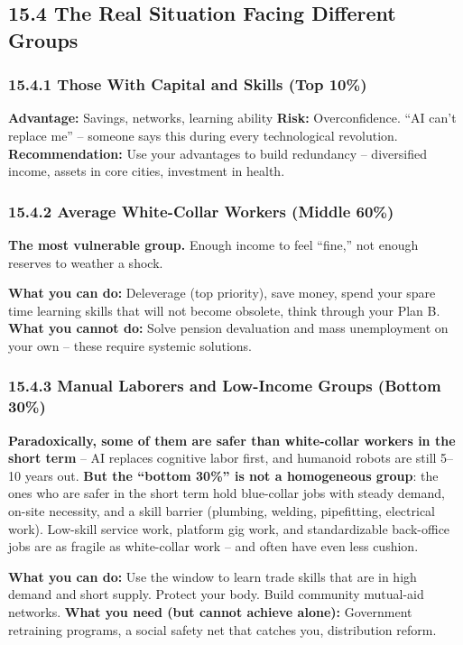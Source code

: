 \documentclass[11pt,a4paper]{article}
\begin{document}
\subsection{15.4 The Real Situation Facing Different Groups}

\subsubsection{15.4.1 Those With Capital and Skills (Top 10\%)}

\textbf{Advantage:} Savings, networks, learning ability \textbf{Risk:} Overconfidence. ``AI can't replace me'' -- someone says this during every technological revolution. \textbf{Recommendation:} Use your advantages to build redundancy -- diversified income, assets in core cities, investment in health.

\subsubsection{15.4.2 Average White-Collar Workers (Middle 60\%)}

\textbf{The most vulnerable group.} Enough income to feel ``fine,'' not enough reserves to weather a shock.

\textbf{What you can do:} Deleverage (top priority), save money, spend your spare time learning skills that will not become obsolete, think through your Plan B. \textbf{What you cannot do:} Solve pension devaluation and mass unemployment on your own -- these require systemic solutions.

\subsubsection{15.4.3 Manual Laborers and Low-Income Groups (Bottom 30\%)}

\textbf{Paradoxically, some of them are safer than white-collar workers in the short term} -- AI replaces cognitive labor first, and humanoid robots are still 5--10 years out. \textbf{But the ``bottom 30\%'' is not a homogeneous group}: the ones who are safer in the short term hold blue-collar jobs with steady demand, on-site necessity, and a skill barrier (plumbing, welding, pipefitting, electrical work). Low-skill service work, platform gig work, and standardizable back-office jobs are as fragile as white-collar work -- and often have even less cushion.

\textbf{What you can do:} Use the window to learn trade skills that are in high demand and short supply. Protect your body. Build community mutual-aid networks. \textbf{What you need (but cannot achieve alone):} Government retraining programs, a social safety net that catches you, distribution reform.
\end{document}
